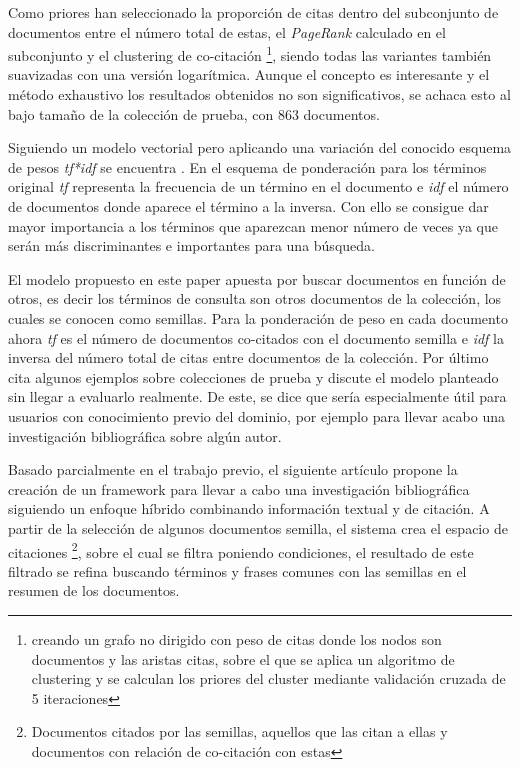 Como priores han seleccionado la proporción de citas dentro del subconjunto de documentos entre el número total de estas, el \textit{PageRank} calculado en el subconjunto y el clustering de co-citación \footnote{creando un grafo no dirigido con peso de citas donde los nodos son documentos y las aristas citas, sobre el que se aplica un algoritmo de clustering y se calculan los priores del cluster mediante validación cruzada de 5 iteraciones}, siendo todas las variantes también suavizadas con una versión logarítmica. Aunque el concepto es interesante y el método exhaustivo los resultados obtenidos no son significativos, se achaca esto al bajo tamaño de la colección de prueba, con 863 documentos.

Siguiendo un modelo vectorial pero aplicando una variación del conocido esquema de pesos \textit{tf*idf} se encuentra \cite{DBLP:conf/ecir/White16}. En el esquema de ponderación para los términos original \textit{tf} representa la frecuencia de un término en el documento e \textit{idf} el número de documentos donde aparece el término a la inversa. Con ello se consigue dar mayor importancia a los términos que aparezcan menor número de veces ya que serán más discriminantes e importantes para una búsqueda.

El modelo propuesto en este paper apuesta por buscar documentos en función de otros, es decir los términos de consulta son otros documentos de la colección, los cuales se conocen como semillas. Para la ponderación de peso en cada documento ahora \textit{tf} es el número de documentos co-citados con el documento semilla e \textit{idf} la inversa del número total de citas entre documentos de la colección. Por último cita algunos ejemplos sobre colecciones de prueba y discute el modelo planteado sin llegar a evaluarlo realmente. De este, se dice que sería especialmente útil para usuarios con conocimiento previo del dominio, por ejemplo para llevar acabo una investigación bibliográfica sobre algún autor.

Basado parcialmente en el trabajo previo, el siguiente artículo \cite{DBLP:conf/ecir/SarolLS18} propone la creación de un framework para llevar a cabo una investigación bibliográfica siguiendo un enfoque híbrido combinando información textual y de citación. A partir de la selección de algunos documentos semilla, el sistema crea el espacio de citaciones \footnote{Documentos citados por las semillas, aquellos que las citan a ellas y documentos con relación de co-citación con estas}, sobre el cual se filtra poniendo condiciones, el resultado de este filtrado se refina buscando términos y frases comunes con las semillas en el resumen de los documentos. 

